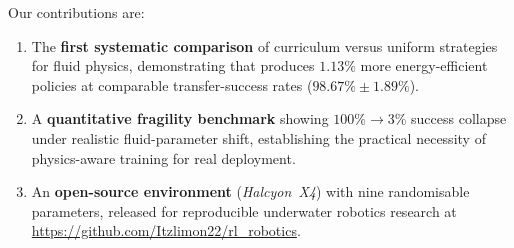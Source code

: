 Our contributions are:
\begin{enumerate}
  \item The \textbf{first systematic comparison} of curriculum versus
    uniform \DR{} strategies for \AUV{} fluid physics, demonstrating
    that \CDR{} produces $1.13\%$ more energy-efficient
    policies at comparable transfer-success rates
    ($98.67\% \pm 1.89\%$).
  \item A \textbf{quantitative \PID{} fragility benchmark} showing
    $100\% \to 3\%$ success collapse under realistic fluid-parameter
    shift, establishing the practical necessity of physics-aware
    training for real \AUV{} deployment.
  \item An \textbf{open-source \MuJoCo{} \AUV{} environment}
    (\textit{Halcyon~X4}) with nine randomisable parameters, released
    for reproducible underwater robotics research at
    \url{https://github.com/Itzlimon22/rl_robotics}.
\end{enumerate}